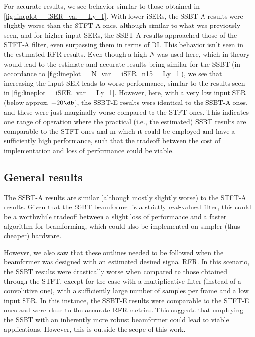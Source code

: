 For accurate results, we see behavior similar to those obtained in \cref{fig:lineplot__iSER_var__Ly_1}. With lower iSERs, the SSBT-A results were slightly worse than the STFT-A ones, although similar to what was previously seen, and for higher input SERs, the SSBT-A results approached those of the STFT-A filter, even surpassing them in terms of DI. This behavior isn't seen in the estimated RFR results. Even though a high $N$ was used here, which in theory would lead to the estimate and accurate results being similar for the SSBT (in accordance to \cref{fig:lineplot__N_var__iSER_n15__Ly_1}), we see that increasing the input SER leads to worse performance, similar to the results seen in \cref{fig:lineplot__iSER_var__Ly_1}. However, here, with a very low input SER (below approx. $-20 \dB$), the SSBT-E results were identical to the SSBT-A ones, and these were just marginally worse compared to the STFT ones. This indicates one range of operation where the practical (i.e., the estimated) SSBT results are comparable to the STFT ones and in which it could be employed and have a sufficiently high performance, such that the tradeoff between the cost of implementation and loss of performance could be viable.


\subsection{General results}

The SSBT-A results are similar (although mostly slightly worse) to the STFT-A results. Given that the SSBT beamformer is a strictly real-valued filter, this could be a worthwhile tradeoff between a slight loss of performance and a faster algorithm for beamforming, which could also be implemented on simpler (thus cheaper) hardware.

However, we also saw that these outlines needed to be followed when the beamformer was designed with an estimated desired signal RFR. In this scenario, the SSBT results were drastically worse when compared to those obtained through the STFT, except for the case with a multiplicative filter (instead of a convolutive one), with a sufficiently large number of samples per frame and a low input SER. In this instance, the SSBT-E results were comparable to the STFT-E ones and were close to the accurate RFR metrics. This suggests that employing the SSBT with an inherently more robust beamformer could lead to viable applications. However, this is outside the scope of this work.